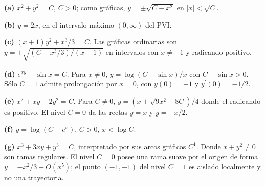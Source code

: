 \noindent\textbf{(a)} $x^2+y^2=C$, $C>0$; como gráficas, $y=\pm\sqrt{C-x^2}$ en $|x|<\sqrt C$.

\noindent\textbf{(b)} $y=2x$, en el intervalo máximo $(0,\infty)$ del PVI.

\noindent\textbf{(c)} $(x+1)y^2+x^3/3=C$. Las gráficas ordinarias son $y=\pm\sqrt{(C-x^3/3)/(x+1)}$ en intervalos con $x\ne-1$ y radicando positivo.

\noindent\textbf{(d)} $e^{xy}+\sin x=C$. Para $x\ne0$, $y=\log(C-\sin x)/x$ con $C-\sin x>0$. Sólo $C=1$ admite prolongación por $x=0$, con $y(0)=-1$ y $y^{\prime}(0)=-1/2$.

\noindent\textbf{(e)} $x^2+xy-2y^2=C$. Para $C\ne0$, $y=(x\pm\sqrt{9x^2-8C})/4$ donde el radicando es positivo. El nivel $C=0$ da las rectas $y=x$ y $y=-x/2$.

\noindent\textbf{(f)} $y=\log(C-e^x)$, $C>0$, $x<\log C$.

\noindent\textbf{(g)} $x^3+3xy+y^3=C$, interpretado por sus arcos gráficos $C^1$. Donde $x+y^2\ne0$ son ramas regulares. El nivel $C=0$ posee una rama suave por el origen de forma $y=-x^2/3+O(x^5)$; el punto $(-1,-1)$ del nivel $C=1$ es aislado localmente y no una trayectoria.
